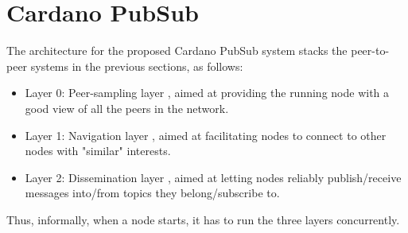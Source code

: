 \section{Cardano PubSub}
\label{sec:cardano-pubsub}

The architecture for the proposed Cardano PubSub system stacks the peer-to-peer systems in the previous sections, as follows:

\begin{itemize}
    \item Layer 0: Peer-sampling layer , aimed at providing the running node with a good view of all the peers in the network.
    \item Layer 1: Navigation layer , aimed at facilitating nodes to connect to other nodes with "similar" interests.
    \item Layer 2: Dissemination layer , aimed at letting nodes reliably publish/receive messages into/from topics they belong/subscribe to.
\end{itemize}

Thus, informally, when a node starts, it has to run the three layers concurrently. 